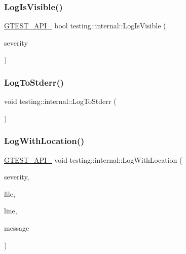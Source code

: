 \mbox{\label{namespacetesting_1_1internal_a69ffdba5ee36743e88d8f89b79e566ff}} 
\subsubsection{\texorpdfstring{LogIsVisible()}{LogIsVisible()}}
{\footnotesize\ttfamily \mbox{\hyperlink{gtest-port_8h_aa73be6f0ba4a7456180a94904ce17790}{G\+T\+E\+S\+T\+\_\+\+A\+P\+I\+\_\+}} bool testing\+::internal\+::\+Log\+Is\+Visible (\begin{DoxyParamCaption}\item[{\mbox{\hyperlink{namespacetesting_1_1internal_a203d1a8a2147a53d12bbdae40d443914}{Log\+Severity}}}]{severity }\end{DoxyParamCaption})}

\mbox{\label{namespacetesting_1_1internal_a06b1b20029fbd1dbeb59752f914fab84}} 
\subsubsection{\texorpdfstring{LogToStderr()}{LogToStderr()}}
{\footnotesize\ttfamily void testing\+::internal\+::\+Log\+To\+Stderr (\begin{DoxyParamCaption}{ }\end{DoxyParamCaption})\hspace{0.3cm}{\ttfamily [inline]}}

\mbox{\label{namespacetesting_1_1internal_a07f4411f23f8b1b731858be9dda3fdcc}} 
\subsubsection{\texorpdfstring{LogWithLocation()}{LogWithLocation()}}
{\footnotesize\ttfamily \mbox{\hyperlink{gtest-port_8h_aa73be6f0ba4a7456180a94904ce17790}{G\+T\+E\+S\+T\+\_\+\+A\+P\+I\+\_\+}} void testing\+::internal\+::\+Log\+With\+Location (\begin{DoxyParamCaption}\item[{\mbox{\hyperlink{namespacetesting_1_1internal_a203d1a8a2147a53d12bbdae40d443914}{testing\+::internal\+::\+Log\+Severity}}}]{severity,  }\item[{const char $\ast$}]{file,  }\item[{int}]{line,  }\item[{const std\+::string \&}]{message }\end{DoxyParamCaption})}

